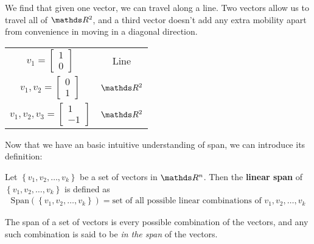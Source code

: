 \documentclass[11pt]{article}
\newcommand{\keyphrase}{\textbf}
\begin{document}
We find that given one vector, we can travel along a line. Two vectors allow us to travel all of $\bbR^2$, and a third vector doesn't add any extra mobility apart from convenience in moving in a diagonal direction.
\begin{table}[H]
\centering
\begin{tabular}{cc}
$v_1 = \begin{bmatrix}1 \\ 0\end{bmatrix}$
&
Line
\\[2em]
$v_1, v_2 = \begin{bmatrix}0 \\ 1\end{bmatrix}$
&
$\bbR^2$
\\[2em]
$v_1, v_2, v_3 = \begin{bmatrix}1 \\ -1\end{bmatrix}$
&
$\bbR^2$
\end{tabular}
\end{table}

Now that we have an basic intuitive understanding of span, we can introduce its definition:

\begin{minipage}[t]{.95\textwidth}
Let $\left\{ v_1, v_2, \dots, v_k \right\}$ be a set of vectors in $\bbR^n$. Then the \keyphrase{linear span} of $\left\{ v_1, v_2, \dots, v_k \right\}$ is defined as
\begin{align*}
\text{Span} \left( \left\{ v_1, v_2, \dots, v_k \right\} \right)
=
\text{set of all possible linear combinations of $v_1, v_2, \dots, v_k$}
\end{align*}
\end{minipage}


The span of a set of vectors is every possible combination of the vectors, and any such combination is said to be \emph{in the span} of the vectors.
\end{document}
